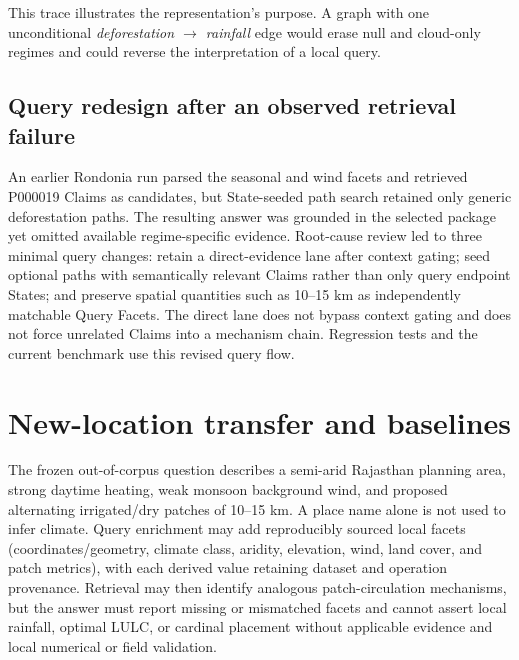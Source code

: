 This trace illustrates the representation's purpose. A graph with one unconditional \emph{deforestation $\rightarrow$ rainfall} edge would erase null and cloud-only regimes and could reverse the interpretation of a local query.

\subsection{Query redesign after an observed retrieval failure}
An earlier Rondonia run parsed the seasonal and wind facets and retrieved P000019 Claims as candidates, but State-seeded path search retained only generic deforestation paths. The resulting answer was grounded in the selected package yet omitted available regime-specific evidence. Root-cause review led to three minimal query changes: retain a direct-evidence lane after context gating; seed optional paths with semantically relevant Claims rather than only query endpoint States; and preserve spatial quantities such as 10--15 km as independently matchable Query Facets. The direct lane does not bypass context gating and does not force unrelated Claims into a mechanism chain. Regression tests and the current benchmark use this revised query flow.

\section{New-location transfer and baselines}
The frozen out-of-corpus question describes a semi-arid Rajasthan planning area, strong daytime heating, weak monsoon background wind, and proposed alternating irrigated/dry patches of 10--15 km. A place name alone is not used to infer climate. Query enrichment may add reproducibly sourced local facets (coordinates/geometry, climate class, aridity, elevation, wind, land cover, and patch metrics), with each derived value retaining dataset and operation provenance. Retrieval may then identify analogous patch-circulation mechanisms, but the answer must report missing or mismatched facets and cannot assert local rainfall, optimal LULC, or cardinal placement without applicable evidence and local numerical or field validation.

